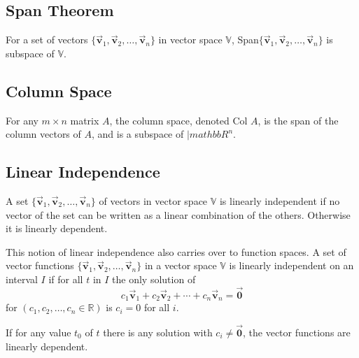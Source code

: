 \documentclass[12pt, landscape, twocolumn]{article}
\let\oldvec\vec
\renewcommand{\vec}[1]{\oldvec{\mathbf{ #1 } } }                    %
\begin{document}
    \subsection{Span Theorem}
    For a set of vectors $\{\vec{v}_1, \vec{v}_2, \ldots, \vec{v}_n\}$ in vector space $\mathbb{V}$, Span$\{\vec{v}_1, \vec{v}_2, \ldots, \vec{v}_n\}$ is subspace of $\mathbb{V}$.

    \subsection{Column Space}
    For any $m \times n$ matrix $A$, the column space, denoted Col $A$, is the span of the column vectors of $A$, and is a subspace of $|mathbb{R}^n$.

    \subsection{Linear Independence}
    A set $\{\vec{v}_1, \vec{v}_2, \ldots, \vec{v}_n\}$ of vectors in vector space $\mathbb{V}$ is linearly independent if no vector of the set can be written as a linear combination of the others. Otherwise it is linearly dependent.

    This notion of linear independence also carries over to function spaces. A set of vector functions $\{\vec{v}_1, \vec{v}_2, \ldots, \vec{v}_n\}$ in a vector space $\mathbb{V}$ is linearly independent on an interval $I$ if for all $t$ in $I$ the only solution of
    \[
    c_1 \vec{v}_1 + c_2 \vec{v}_2 + \cdots + c_n \vec{v}_n = \vec{0}
    \]
    for $(c_1, c_2, \ldots, c_n \in \mathbb{R})$ is $c_i = 0$ for all $i$.

    If for any value $t_0$ of $t$ there is any solution with $c_i \neq \vec{0}$, the vector functions are linearly dependent.
\end{document}
